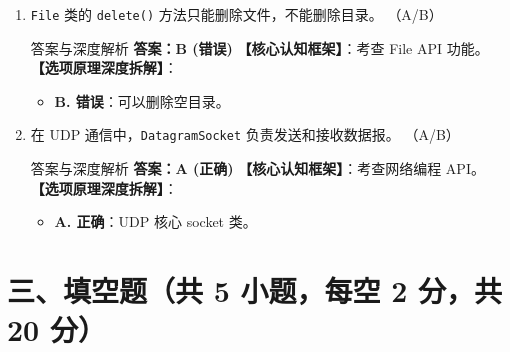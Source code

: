 ﻿\documentclass[12pt, a4paper]{ctexart}
\newcommand{\code}[1]{\texttt{#1}}
\begin{document}
\begin{enumerate}[label=\arabic*., itemsep=1.5em]
	\item \code{File} 类的 \code{delete()} 方法只能删除文件，不能删除目录。 \underline{\hspace{1cm}}（A/B）
	      \begin{bluebox}{答案与深度解析}
		      \textbf{答案：B (错误)}
		      \textbf{【核心认知框架】}：考查 File API 功能。
		      \textbf{【选项原理深度拆解】}：
		      \begin{itemize}[leftmargin=*, nosep]
			      \item \textbf{B. 错误}：可以删除空目录。
		      \end{itemize}
	      \end{bluebox}

	\item 在 UDP 通信中，\code{DatagramSocket} 负责发送和接收数据报。 \underline{\hspace{1cm}}（A/B）
	      \begin{bluebox}{答案与深度解析}
		      \textbf{答案：A (正确)}
		      \textbf{【核心认知框架】}：考查网络编程 API。
		      \textbf{【选项原理深度拆解】}：
		      \begin{itemize}[leftmargin=*, nosep]
			      \item \textbf{A. 正确}：UDP 核心 socket 类。
		      \end{itemize}
	      \end{bluebox}
\end{enumerate}

\newpage
\section{三、填空题（共 5 小题，每空 2 分，共 20 分）}
\end{document}
